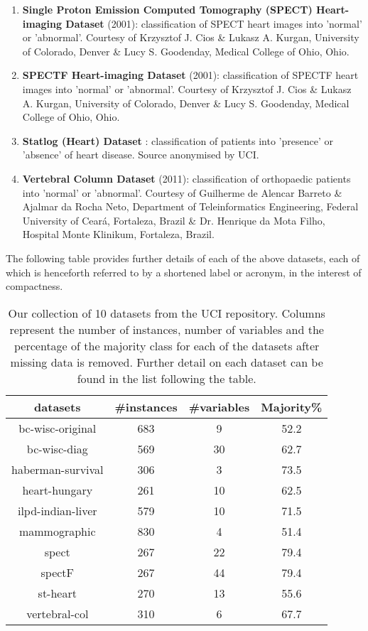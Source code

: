\documentclass{bmcart}
\begin{document}
\begin{enumerate}
    \item \textbf{Single Proton Emission Computed Tomography (SPECT) Heart-imaging Dataset} (2001): classification of SPECT heart images into 'normal' or 'abnormal'. Courtesy of Krzysztof J. Cios \& Lukasz A. Kurgan, University of Colorado, Denver \& Lucy S. Goodenday, Medical College of Ohio, Ohio.
    \item \textbf{SPECTF Heart-imaging Dataset} (2001): classification of SPECTF heart images into 'normal' or 'abnormal'. Courtesy of Krzysztof J. Cios \& Lukasz A. Kurgan, University of Colorado, Denver \& Lucy S. Goodenday, Medical College of Ohio, Ohio.
    \item \textbf{Statlog (Heart) Dataset} : classification of patients into 'presence' or 'absence' of heart disease. Source anonymised by UCI.
    \item \textbf{Vertebral Column Dataset} (2011): classification of orthopaedic patients into 'normal' or 'abnormal'. Courtesy of Guilherme de Alencar Barreto \& Ajalmar da Rocha Neto, Department of Teleinformatics Engineering, Federal University of Ceará, Fortaleza, Brazil \& Dr. Henrique da Mota Filho, Hospital Monte Klinikum, Fortaleza, Brazil.
\end{enumerate}

The following table provides further details of each of the above datasets, each of which is henceforth referred to by a shortened label or acronym, in the interest of compactness.

\begin{table}[b]
\centering
\begin{tabular*}{8cm} {@{}c @{\extracolsep{\fill}} ccc@{}}
\hline
datasets        & \#instances  &\#variables & Majority\%\\
\hline
bc-wisc-original&       683    &   9        &   52.2\\ 
bc-wisc-diag    &       569    &   30       &   62.7\\ 
haberman-survival&      306    &   3        &   73.5\\
heart-hungary   &       261    &   10       &   62.5\\
ilpd-indian-liver&      579    &   10       &   71.5\\
mammographic    &       830    &   4        &   51.4\\
spect           &       267    &   22       &   79.4\\
spectF          &       267    &   44       &   79.4\\
st-heart        &       270    &   13       &   55.6\\
vertebral-col   &       310    &   6        &   67.7\\
\hline
\end{tabular*}
\caption{Our collection of 10 datasets from the UCI repository. Columns represent the number of instances, number of variables and the percentage of the majority class for each of the datasets after missing data is removed. Further detail on each dataset can be found in the list following the table.}
\label{table:datasets}
\end{table}
\end{document}

